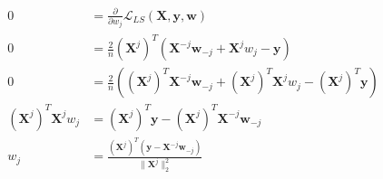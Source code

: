 \newcommand{\matrix}[1]{\mathbf{#1}}
\newcommand{\vector}[1]{\mathbf{#1}}
\newcommand{\X}{\matrix{X}}
\newcommand{\y}{\vector{y}}
\newcommand{\w}{\vector{w}}
\begin{align*}
0 &= \frac{\partial}{\partial w_j} \mathcal{L}_{LS}(\X,\y,\w) \\
0 &= \frac{2}{n} (\X^j)^T (\X^{-j} \w_{-j} + \X^j w_j - \y) \\
0 &= \frac{2}{n} \left( (\X^j)^T \X^{-j} \w_{-j} + (\X^j)^T \X^j w_j - (\X^j)^T \y \right) \\
(\X^j)^T \X^j w_j &= (\X^j)^T \y - (\X^j)^T \X^{-j} \w_{-j} \\
w_j &= \frac{(\X^j)^T (\y - \X^{-j} \w_{-j} )}{\|\X^j\|_2^2} \\
\end{align*}
